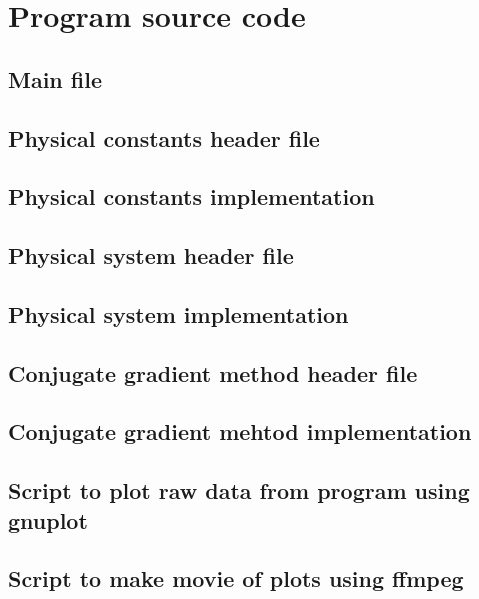 \appendix
\chapter{Program source code}

\section{Main file}



\section{Physical constants header file}



\section{Physical constants implementation}



\section{Physical system header file}



\section{Physical system implementation}



\section{Conjugate gradient method header file}



\section{Conjugate gradient mehtod implementation}



\section{Script to plot raw data from program using gnuplot}



\section{Script to make movie of plots using ffmpeg}





